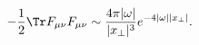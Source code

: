 \begin{equation}\label{actiondecay}
-\frac{1}{2}\Tr F_{\mu\nu}F_{\mu\nu}\sim
\frac{4 \pi |\omega|}{|x_\perp|^3}e^{-4|\omega||x_\perp|}.
\end{equation}

